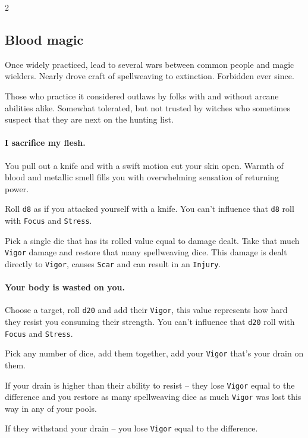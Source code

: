 \begin{multicols*}{2}

\subsection*{Blood magic}

Once widely practiced, lead to several wars between common people and magic wielders. Nearly drove craft of spellweaving to extinction. 
Forbidden ever since. 

Those who practice it considered outlaws by folks with and without arcane abilities alike. 
Somewhat tolerated, but not trusted by witches who sometimes suspect that they are next on the hunting list.

\paragraph{I sacrifice my flesh.} You pull out a knife and with a swift motion cut your skin open. 
Warmth of blood and metallic smell fills you with overwhelming sensation of returning power. 

Roll \texttt{d8} as if you attacked yourself with a knife. You can't influence that \texttt{d8} roll with \texttt{Focus} and \texttt{Stress}.

Pick a single die that has its rolled value equal to damage dealt. Take that much \texttt{Vigor} damage and restore that many spellweaving dice.
This damage is dealt directly to \texttt{Vigor}, causes \texttt{Scar} and can result in an \texttt{Injury}. 



\paragraph{Your body is wasted on you. } Choose a target, roll \texttt{d20} and add their \texttt{Vigor}, this value represents how hard they resist you consuming their strength. You can't influence that \texttt{d20} roll with \texttt{Focus} and \texttt{Stress}.
 
Pick any number of dice, add them together, add your \texttt{Vigor} that's your drain on them. 
 
If your drain is higher than their ability to resist -- they lose \texttt{Vigor} equal to the difference and you restore as many spellweaving dice as much \texttt{Vigor} was lost this way in any of your pools.

If they withstand your drain -- you lose \texttt{Vigor} equal to the difference. 

\end{multicols*}
